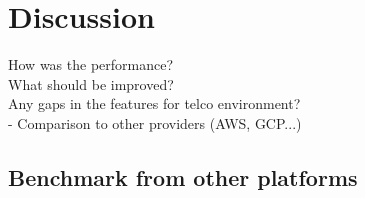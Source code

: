 \chapter{Discussion}
\label{chapter:discussion}

How was the performance? \\
What should be improved? \\
Any gaps in the features for telco environment? \\
- Comparison to other providers (AWS, GCP...) \\

\section{Benchmark from other platforms}